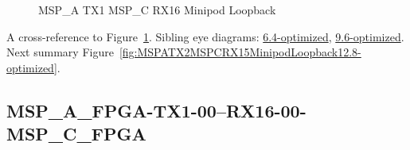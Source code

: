 \begin{figure}[h]
\begin{subfigure}{0.33\textwidth}
\hyperref[sec:MSPAFPGATX106RX1606MSPCFPGA12.8-optimized]{}
\end{subfigure}\hspace*{\fill}
\begin{subfigure}{0.33\textwidth}
\hyperref[sec:MSPAFPGATX107RX1607MSPCFPGA12.8-optimized]{}
\end{subfigure}\hspace*{\fill}
\begin{subfigure}{0.33\textwidth}
\hyperref[sec:MSPAFPGATX108RX1608MSPCFPGA12.8-optimized]{}
\end{subfigure}

\begin{subfigure}{0.33\textwidth}
\hyperref[sec:MSPAFPGATX109RX1609MSPCFPGA12.8-optimized]{}
\end{subfigure}\hspace*{\fill}
\begin{subfigure}{0.33\textwidth}
\hyperref[sec:MSPAFPGATX110RX1610MSPCFPGA12.8-optimized]{}
\end{subfigure}\hspace*{\fill}
\begin{subfigure}{0.33\textwidth}
\hyperref[sec:MSPAFPGATX111RX1611MSPCFPGA12.8-optimized]{}
\end{subfigure}

\caption{MSP\_A TX1 MSP\_C RX16 Minipod Loopback} \label{fig:MSPATX1MSPCRX16MinipodLoopback12.8-optimized}
\end{figure}

A cross-reference to Figure~\ref{fig:MSPATX1MSPCRX16MinipodLoopback12.8-optimized}.
Sibling eye diagrams: \hyperref[sec:MSPATX1MSPCRX16MinipodLoopback6.4-optimized]{6.4-optimized}, \hyperref[sec:MSPATX1MSPCRX16MinipodLoopback9.6-optimized]{9.6-optimized}. \\
Next summary Figure~\ref{fig:MSPATX2MSPCRX15MinipodLoopback12.8-optimized}.
\clearpage
% 
\subsection{MSP\_A\_FPGA-TX1-00--RX16-00-MSP\_C\_FPGA}\label{sec:MSPAFPGATX100RX1600MSPCFPGA12.8-optimized}

